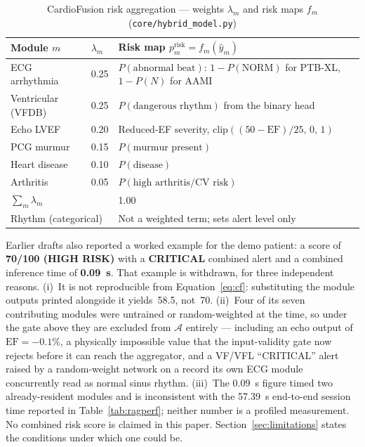 \documentclass[AMA,STIX1COL,]{WileyNJD-v2}
\begin{document}
\begin{table}[!t]
\caption{CardioFusion risk aggregation --- weights $\lambda_m$ and
risk maps $f_m$ (\texttt{core/hybrid\_model.py})}
\label{tab:cf}
\centering
\renewcommand{\arraystretch}{1.15}
\begin{tabular}{p{3.4cm}p{1.4cm}p{7.4cm}}
\toprule
\textbf{Module $m$} & \textbf{$\lambda_m$} &
\textbf{Risk map $p_m^{\mathrm{risk}} = f_m(\hat{y}_m)$}\\
\midrule
ECG arrhythmia   & 0.25 & $P(\text{abnormal beat})$: $1-P(\mathrm{NORM})$ for PTB-XL, $1-P(N)$ for AAMI\\
Ventricular (VFDB) & 0.25 & $P(\text{dangerous rhythm})$ from the binary head\\
Echo LVEF        & 0.20 & Reduced-EF severity, $\mathrm{clip}((50-\mathrm{EF})/25,\,0,\,1)$\\
PCG murmur       & 0.15 & $P(\text{murmur present})$\\
Heart disease    & 0.10 & $P(\text{disease})$\\
Arthritis        & 0.05 & $P(\text{high arthritis/CV risk})$\\
\midrule
\multicolumn{2}{l}{$\sum_m \lambda_m$} & 1.00\\
\multicolumn{2}{l}{Rhythm (categorical)} & Not a weighted term; sets alert level only\\
\bottomrule
\end{tabular}
\end{table}

Earlier drafts also reported a worked example for the demo patient:
a score of \textbf{70/100 (HIGH RISK)} with a \textbf{CRITICAL}
combined alert and a combined inference time of \textbf{0.09~s}.
That example is withdrawn, for three independent reasons. (i)~It is
not reproducible from Equation~\ref{eq:cf}: substituting the module
outputs printed alongside it yields~58.5, not~70. (ii)~Four of its
seven contributing modules were untrained or random-weighted at the
time, so under the gate above they are excluded from
$\mathcal{A}$ entirely --- including an echo output
of $\mathrm{EF}=-0.1\%$, a physically impossible value that the
input-validity gate now rejects before it can reach the aggregator,
and a VF/VFL ``CRITICAL'' alert raised by a random-weight network on a
record its own ECG module concurrently read as normal sinus rhythm.
(iii)~The 0.09~s figure timed two already-resident modules and is
inconsistent with the 57.39~s end-to-end session time reported in
Table~\ref{tab:ragperf}; neither number is a profiled measurement.
No combined risk score is claimed in this paper. Section~\ref{sec:limitations}
states the conditions under which one could be.
\end{document}
